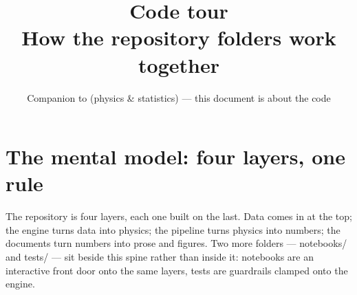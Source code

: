 \documentclass[11pt]{article}
\title{\sffamily\bfseries\color{forest}\LARGE Code tour\\[2pt]
  \large\normalfont\color{char} How the repository folders work together}
\author{}
\date{\small\sffamily\color{dim}Companion to \code{docs/guidebook/} (physics \& statistics) --- this document is about the code}
\newcommand{\code}[1]{{\ttfamily\small #1}}
\begin{document}
\maketitle
\thispagestyle{fancy}
\vspace{-1.2cm}

\tableofcontents
\vspace{0.4cm}

\section{The mental model: four layers, one rule}

The repository is four layers, each one built on the last. Data comes in at
the top; the engine turns data into physics; the pipeline turns physics into
numbers; the documents turn numbers into prose and figures. Two more folders
--- \code{notebooks/} and \code{tests/} --- sit beside this spine rather than
inside it: notebooks are an interactive front door onto the same layers,
tests are guardrails clamped onto the engine.
\end{document}
